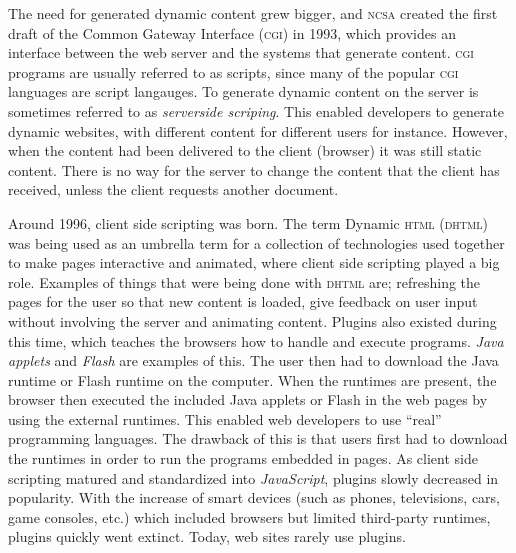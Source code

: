\documentclass[a4paper,11pt]{kth-mag}
\begin{document}
        The need for generated dynamic content grew bigger, and \textsc{ncsa} created the first draft of the Common Gateway Interface (\textsc{cgi}) in 1993, which provides an interface between the web server and the systems that generate content.
        \textsc{cgi} programs are usually referred to as scripts, since many of the popular \textsc{cgi} languages are script langauges.
        To generate dynamic content on the server is sometimes referred to as \emph{serverside scriping}.
        This enabled developers to generate dynamic websites, with different content for different users for instance.
        However, when the content had been delivered to the client (browser) it was still static content.
        There is no way for the server to change the content that the client has received, unless the client requests another document.

        Around 1996, client side scripting was born.
        The term Dynamic \textsc{html} (\textsc{dhtml}) was being used as an umbrella term for a collection of technologies used together to make pages interactive and animated, where client side scripting played a big role.
        Examples of things that were being done with \textsc{dhtml} are; refreshing the pages for the user so that new content is loaded, give feedback on user input without involving the server and animating content.
        Plugins also existed during this time, which teaches the browsers how to handle and execute programs. \emph{Java applets} and \emph{Flash} are examples of this.
        The user then had to download the Java runtime or Flash runtime on the computer.
        When the runtimes are present, the browser then executed the included Java applets or Flash in the web pages by using the external runtimes.
        This enabled web developers to use ``real'' programming languages.
        The drawback of this is that users first had to download the runtimes in order to run the programs embedded in pages.
        As client side scripting matured and standardized into \emph{JavaScript}, plugins slowly decreased in popularity.
        With the increase of smart devices (such as phones, televisions, cars, game consoles, etc.) which included browsers but limited third-party runtimes, plugins quickly went extinct.
        Today, web sites rarely use plugins.
\end{document}
